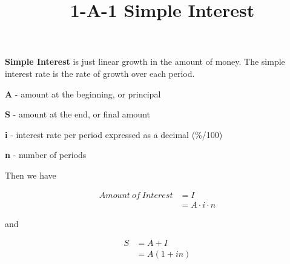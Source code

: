 \documentclass[12pt]{article}
\title{\normalfont\ 1-A-1 Simple Interest} %
\author{} %
\date{}  %
\begin{document}
\maketitle %

\vspace{-1in}

\begin{flushleft}
    \textbf{Simple Interest} is just linear growth in the amount of money.
    The simple interest rate is the rate of growth over each period.
\end{flushleft}

\begin{description}
    \item\textbf{A} - amount at the beginning, or principal
    \item\textbf{S} - amount at the end, or final amount
    \item\textbf{i} - interest rate per period expressed as a decimal {(\%/100)}
    \item\textbf{n} - number of periods
\end{description}

\begin{flushleft}
    Then we have
\end{flushleft}

\vspace{-.5in}

\begin{align*}
    Amount \: of \: Interest & = I                 \\
                             & = A \cdot i \cdot n
\end{align*}

\begin{flushleft}
    and
\end{flushleft}

\vspace{-.5in}

\begin{align*}
    S & = A + I     \\
      & = A(1 + in)
\end{align*}

\vspace{.25in}
\end{document}
